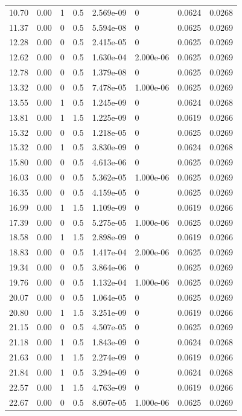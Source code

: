 \documentclass[preview]{standalone}
\begin{document}
{{\begin{tabular}{L{1.2cm}C{1.2cm} C{0.3cm}C{0.5cm} C{1.4cm}C{1.4cm} C{1.4cm}C{1.4cm}}
  10.70  &  0.00  & 1     & 0.5 &  2.569e-09  & 0  & 0.0624 &  0.0268   \\ 
  11.37  &  0.00  & 0     & 0.5 &  5.594e-08  & 0  & 0.0625 &  0.0269   \\ 
  12.28  &  0.00  & 0     & 0.5 &  2.415e-05  & 0  & 0.0625 &  0.0269   \\ 
  12.62  &  0.00  & 0     & 0.5 &  1.630e-04  & 2.000e-06  & 0.0625 &  0.0269   \\ 
  12.78  &  0.00  & 0     & 0.5 &  1.379e-08  & 0  & 0.0625 &  0.0269   \\ 
  13.32  &  0.00  & 0     & 0.5 &  7.478e-05  & 1.000e-06  & 0.0625 &  0.0269   \\ 
  13.55  &  0.00  & 1     & 0.5 &  1.245e-09  & 0  & 0.0624 &  0.0268   \\ 
  13.81  &  0.00  & 1     & 1.5 &  1.225e-09  & 0  & 0.0619 &  0.0266   \\ 
  15.32  &  0.00  & 0     & 0.5 &  1.218e-05  & 0  & 0.0625 &  0.0269   \\ 
  15.32  &  0.00  & 1     & 0.5 &  3.830e-09  & 0  & 0.0624 &  0.0268   \\ 
  15.80  &  0.00  & 0     & 0.5 &  4.613e-06  & 0  & 0.0625 &  0.0269   \\ 
  16.03  &  0.00  & 0     & 0.5 &  5.362e-05  & 1.000e-06  & 0.0625 &  0.0269   \\ 
  16.35  &  0.00  & 0     & 0.5 &  4.159e-05  & 0  & 0.0625 &  0.0269   \\ 
  16.99  &  0.00  & 1     & 1.5 &  1.109e-09  & 0  & 0.0619 &  0.0266   \\ 
  17.39  &  0.00  & 0     & 0.5 &  5.275e-05  & 1.000e-06  & 0.0625 &  0.0269   \\ 
  18.58  &  0.00  & 1     & 1.5 &  2.898e-09  & 0  & 0.0619 &  0.0266   \\ 
  18.83  &  0.00  & 0     & 0.5 &  1.417e-04  & 2.000e-06  & 0.0625 &  0.0269   \\ 
  19.34  &  0.00  & 0     & 0.5 &  3.864e-06  & 0  & 0.0625 &  0.0269   \\ 
  19.76  &  0.00  & 0     & 0.5 &  1.132e-04  & 1.000e-06  & 0.0625 &  0.0269   \\ 
  20.07  &  0.00  & 0     & 0.5 &  1.064e-05  & 0  & 0.0625 &  0.0269   \\ 
  20.80  &  0.00  & 1     & 1.5 &  3.251e-09  & 0  & 0.0619 &  0.0266   \\ 
  21.15  &  0.00  & 0     & 0.5 &  4.507e-05  & 0  & 0.0625 &  0.0269   \\ 
  21.18  &  0.00  & 1     & 0.5 &  1.843e-09  & 0  & 0.0624 &  0.0268   \\ 
  21.63  &  0.00  & 1     & 1.5 &  2.274e-09  & 0  & 0.0619 &  0.0266   \\ 
  21.84  &  0.00  & 1     & 0.5 &  3.294e-09  & 0  & 0.0624 &  0.0268   \\ 
  22.57  &  0.00  & 1     & 1.5 &  4.763e-09  & 0  & 0.0619 &  0.0266   \\ 
  22.67  &  0.00  & 0     & 0.5 &  8.607e-05  & 1.000e-06  & 0.0625 &  0.0269   \\ 
\hline 
\end{tabular} 

}}
\end{document}
